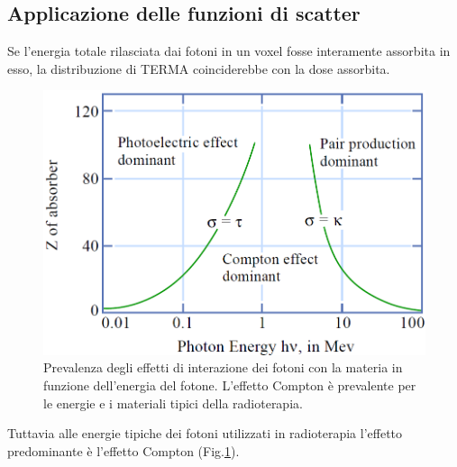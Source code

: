 {\subsection{Applicazione delle funzioni di scatter}
Se l'energia totale rilasciata dai fotoni in un voxel fosse interamente assorbita in esso, la distribuzione di TERMA coinciderebbe con la dose assorbita.\\
\begin{figure}
\centering
\includegraphics[width=.7\textwidth]{./cap1/compt_dom.png}
\caption{Prevalenza degli effetti di interazione dei fotoni con la materia in funzione dell'energia del fotone. L'effetto Compton è prevalente per le energie e i materiali tipici della radioterapia.}
\label{fig:compt_dom}
\end{figure}
Tuttavia alle energie tipiche dei fotoni utilizzati in radioterapia l'effetto predominante è l'effetto Compton (Fig.\ref{fig:compt_dom}).

}
